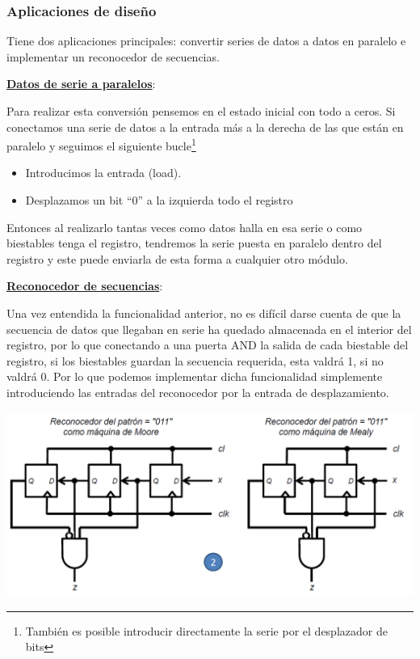 \documentclass[a4paper,10pt]{book}
\begin{document}
\subsubsection*{Aplicaciones de diseño}
Tiene dos aplicaciones principales: convertir series de datos a datos en paralelo e implementar un reconocedor de secuencias.\par
\underline{\textbf{Datos de serie a paralelos}}:\par
Para realizar esta conversión pensemos en el estado inicial con todo a ceros. Si conectamos una serie de datos a la entrada más a la derecha de las que están en paralelo y seguimos el siguiente bucle\footnote{También es posible introducir directamente la serie por el desplazador de bits}
\begin{itemize}
\item Introducimos la entrada (load).
\item Desplazamos un bit ``0'' a la izquierda todo el registro
\end{itemize}
Entonces al realizarlo tantas veces como datos halla en esa serie o como biestables tenga el registro, tendremos la serie puesta en paralelo dentro del registro y este puede enviarla de esta forma a cualquier otro módulo.

\underline{\textbf{Reconocedor de secuencias}}:\par
Una vez entendida la funcionalidad anterior, no es difícil darse cuenta de que la secuencia de datos que llegaban en serie ha quedado almacenada en el interior del registro, por lo que conectando a una puerta AND la salida de cada biestable del registro, si los biestables guardan la secuencia requerida, esta valdrá 1, si no valdrá 0. Por lo que podemos implementar dicha funcionalidad simplemente introduciendo las entradas del reconocedor por la entrada de desplazamiento.
\vspace{1cm}
\begin{center}
\includegraphics[scale=0.70]{reconocedor de secuencias}
\end{center}
\end{document}
